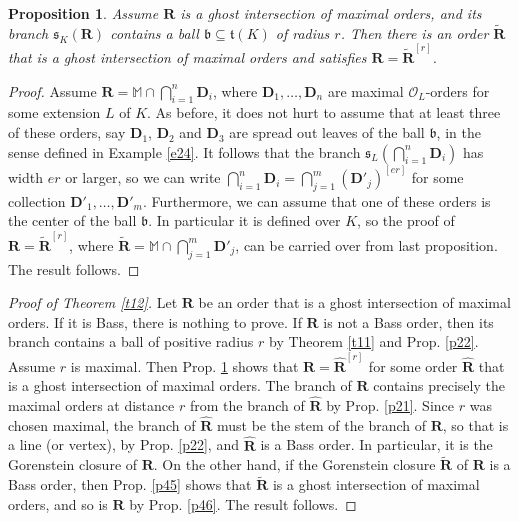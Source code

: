 \documentclass{amsart}
\newtheorem{proposition}[theorem]{Proposition}
\theoremstyle{definition}
\newcommand\alge{\mathbb{M}}
\newcommand\oink{\mathcal O}
\newcommand\Ra{\mathbf R}
\newcommand\Da{\mathbf{D}}
\begin{document}
\begin{proposition}\label{p47}
    Assume $\Ra$ is a ghost intersection of 
    maximal orders, and its branch 
    $\mathfrak{s}_K(\Ra)$ contains a ball 
    $\mathfrak{b}\subseteq\mathfrak{t}(K)$ of 
    radius $r$. Then there is
    an order $\tilde{\Ra}$ that is a ghost intersection of maximal
    orders and satisfies $\Ra=\tilde{\Ra}^{[r]}$.
\end{proposition}

\begin{proof}
    Assume $\Ra=\alge \cap\bigcap_{i=1}^n\Da_i$,
    where $\Da_1,\dots,\Da_n$ are maximal $\oink_L$-orders for
    some extension $L$ of $K$. As before, it does not hurt
    to assume that at least three of these orders,
    say $\Da_1$, $\Da_2$ and $\Da_3$ are spread out
    leaves of the ball $\mathfrak{b}$, in the sense
    defined in Example \ref{e24}. It follows that the 
    branch $\mathfrak{s}_L\left(\bigcap_{i=1}^n\Da_i\right)$
    has width $er$ or larger, so we can write
    $\bigcap_{i=1}^n\Da_i=\bigcap_{j=1}^m(\Da'_j)^{[er]}$
    for some collection $\Da'_1,\dots,\Da'_m$.
    Furthermore, we can assume that one of these orders
    is the center of the ball $\mathfrak{b}$. In particular it is defined over $K$, so the proof of $\Ra=\tilde{\Ra}^{[r]}$,
    where $\tilde{\Ra}=\alge \cap
    \bigcap_{j=1}^m\Da'_j$, can be
    carried over from last proposition.
    The result follows.
\end{proof}

\begin{proof}[Proof of Theorem \ref{t12}]
Let $\Ra$ be an order that is a
ghost intersection 
of maximal orders. If it is Bass,
there is nothing to prove.
If $\Ra$ is not a Bass order, 
then its branch contains 
a ball of positive radius $r$ by 
Theorem \ref{t11} and
Prop. \ref{p22}. 
Assume $r$ is maximal.
Then Prop. \ref{p47} shows that 
$\Ra=\hat{\Ra}^{[r]}$ for some
order $\hat{\Ra}$ that is a ghost intersection 
of maximal orders. The branch of $\Ra$
contains precisely the maximal orders at distance
$r$ from the branch of $\hat{\Ra}$ by 
Prop. \ref{p21}. Since $r$ was chosen maximal, 
the branch of $\hat{\Ra}$ must be the stem
of the branch of $\Ra$, so that is a line
(or vertex), by Prop. \ref{p22}, 
and $\hat{\Ra}$ is a Bass
order. In particular, it is the Gorenstein closure
of $\Ra$.
On the other hand, if the Gorenstein
closure $\tilde{\Ra}$ of $\Ra$ is a Bass order,
then Prop. \ref{p45} shows that $\tilde{\Ra}$
is a ghost intersection of maximal orders, and
so is $\Ra$ by Prop. \ref{p46}. 
The result follows.
\end{proof}
\end{document}
